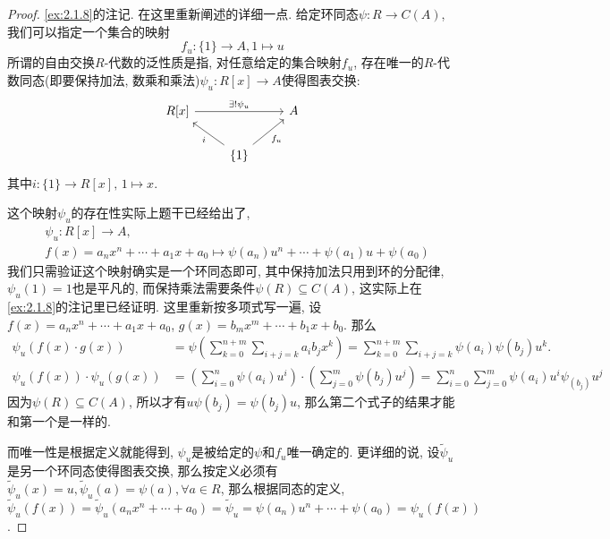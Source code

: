 \begin{proof}
    \ref{ex:2.1.8}的注记. 在这里重新阐述的详细一点. 给定环同态$\psi:R \to C(A)$, 我们可以指定一个集合的映射
    \[
        f_u:\{1\} \to A, 1 \mapsto u
    \]
    所谓的自由交换$R$-代数的泛性质是指, 对任意给定的集合映射$f_u$, 存在唯一的$R$-代数同态(即要保持加法, 数乘和乘法)$\psi_u:R[x] \to A$使得图表交换:
    \[
        \begin{tikzcd}
            {R[x]} \arrow[rr, "\exists!\psi_u"] &                                          & A \\
                                                & \{1\} \arrow[lu, "i"] \arrow[ru, "f_u"'] &  
        \end{tikzcd}
    \]
    其中$i:\{1\} \to R[x],\, 1 \mapsto x$.

    这个映射$\psi_u$的存在性实际上题干已经给出了,
    \[
    \begin{aligned}
        &\psi_u:R[x] \to A,\\
        &f(x) = a_nx^n + \cdots + a_1x + a_0 \mapsto \psi(a_n)u^n + \cdots + \psi(a_1)u + \psi(a_0)
    \end{aligned} 
    \]
    我们只需验证这个映射确实是一个环同态即可, 其中保持加法只用到环的分配律, $\psi_u(1) = 1$也是平凡的, 而保持乘法需要条件$\psi(R) \subseteq C(A)$, 这实际上在\ref{ex:2.1.8}的注记里已经证明. 这里重新按多项式写一遍, 设$f(x) = a_nx^n + \cdots + a_1x + a_0$, $g(x) = b_mx^m + \cdots + b_1x + b_0$. 那么
    \[
    \begin{aligned}
        \psi_u(f(x) \cdot g(x)) &= \psi\left(\sum_{k = 0}^{n + m}\sum_{i + j = k} a_ib_jx^k\right) = \sum_{k = 0}^{n + m}\sum_{i + j = k} \psi(a_i)\psi(b_j)u^k.\\
        \psi_u(f(x)) \cdot \psi_u(g(x)) &= \left(\sum_{i = 0}^{n} \psi(a_i)u^i\right) \cdot \left(\sum_{j = 0}^{m} \psi(b_j)u^j\right) = \sum_{i = 0}^{n}\sum_{j = 0}^{m} \psi(a_i)u^i\psi_(b_j)u^j
    \end{aligned} 
    \]
    因为$\psi(R) \subseteq C(A)$, 所以才有$u\psi(b_j) = \psi(b_j)u$, 那么第二个式子的结果才能和第一个是一样的.

    而唯一性是根据定义就能得到, $\psi_u$是被给定的$\psi$和$f_u$唯一确定的. 更详细的说, 设$\widetilde{\psi}_u$是另一个环同态使得图表交换, 那么按定义必须有$\widetilde{\psi}_u(x) = u, \widetilde{\psi}_u(a) = \psi(a), \forall a \in R$, 那么根据同态的定义, $\widetilde{\psi}_u(f(x)) = \widetilde{\psi}_u(a_nx^n + \cdots + a_0) = \widetilde{\psi}_u = \psi(a_n)u^n + \cdots + \psi(a_0) = \psi_u(f(x))$.
\end{proof}

